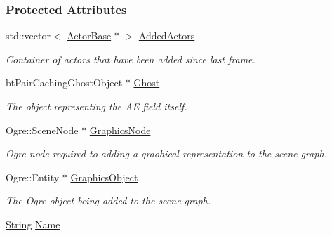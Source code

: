 \subsubsection*{Protected Attributes}
\begin{DoxyCompactItemize}
\item 
\hypertarget{classphys_1_1AreaEffect_a5bd2ad15db98ecc140a8bf2fee8d0c1f}{
std::vector$<$ \hyperlink{classphys_1_1ActorBase}{ActorBase} $\ast$ $>$ \hyperlink{classphys_1_1AreaEffect_a5bd2ad15db98ecc140a8bf2fee8d0c1f}{AddedActors}}
\label{classphys_1_1AreaEffect_a5bd2ad15db98ecc140a8bf2fee8d0c1f}

\begin{DoxyCompactList}\small\item\em Container of actors that have been added since last frame. \item\end{DoxyCompactList}\item 
\hypertarget{classphys_1_1AreaEffect_ae730c591bf929404f337d71d4119bde8}{
btPairCachingGhostObject $\ast$ \hyperlink{classphys_1_1AreaEffect_ae730c591bf929404f337d71d4119bde8}{Ghost}}
\label{classphys_1_1AreaEffect_ae730c591bf929404f337d71d4119bde8}

\begin{DoxyCompactList}\small\item\em The object representing the AE field itself. \item\end{DoxyCompactList}\item 
\hypertarget{classphys_1_1AreaEffect_a7fbb785d7357cc7eac68dc94bb72c18a}{
Ogre::SceneNode $\ast$ \hyperlink{classphys_1_1AreaEffect_a7fbb785d7357cc7eac68dc94bb72c18a}{GraphicsNode}}
\label{classphys_1_1AreaEffect_a7fbb785d7357cc7eac68dc94bb72c18a}

\begin{DoxyCompactList}\small\item\em Ogre node required to adding a graohical representation to the scene graph. \item\end{DoxyCompactList}\item 
\hypertarget{classphys_1_1AreaEffect_a31b755c85d318438e42e300de56d2e5c}{
Ogre::Entity $\ast$ \hyperlink{classphys_1_1AreaEffect_a31b755c85d318438e42e300de56d2e5c}{GraphicsObject}}
\label{classphys_1_1AreaEffect_a31b755c85d318438e42e300de56d2e5c}

\begin{DoxyCompactList}\small\item\em The Ogre object being added to the scene graph. \item\end{DoxyCompactList}\item 
\hypertarget{classphys_1_1AreaEffect_a1cf5a878eb22b30a166f5b065944a986}{
\hyperlink{namespacephys_aa03900411993de7fbfec4789bc1d392e}{String} \hyperlink{classphys_1_1AreaEffect_a1cf5a878eb22b30a166f5b065944a986}{Name}}
\label{classphys_1_1AreaEffect_a1cf5a878eb22b30a166f5b065944a986}


\end{DoxyCompactItemize}
